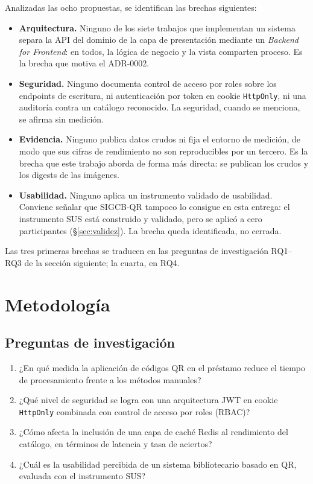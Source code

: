 \documentclass[11pt,a4paper]{article}
\begin{document}
Analizadas las ocho propuestas, se identifican las brechas siguientes:
\begin{itemize}[leftmargin=*]
  \item \textbf{Arquitectura.} Ninguno de los siete trabajos que implementan un
        sistema separa la API del dominio de la capa de presentación mediante un
        \emph{Backend for Frontend}: en todos, la lógica de negocio y la vista
        comparten proceso. Es la brecha que motiva el ADR-0002.
  \item \textbf{Seguridad.} Ninguno documenta control de acceso por roles sobre
        los endpoints de escritura, ni autenticación por token en cookie
        \texttt{HttpOnly}, ni una auditoría contra un catálogo reconocido. La
        seguridad, cuando se menciona, se afirma sin medición.
  \item \textbf{Evidencia.} Ninguno publica datos crudos ni fija el entorno de
        medición, de modo que sus cifras de rendimiento no son reproducibles por
        un tercero. Es la brecha que este trabajo aborda de forma más directa:
        se publican los crudos y los digests de las imágenes.
  \item \textbf{Usabilidad.} Ninguno aplica un instrumento validado de
        usabilidad. Conviene señalar que SIGCB-QR tampoco lo consigue en esta
        entrega: el instrumento SUS está construido y validado, pero se aplicó a
        cero participantes (§\ref{sec:validez}). La brecha queda identificada,
        no cerrada.
\end{itemize}

Las tres primeras brechas se traducen en las preguntas de investigación
RQ1--RQ3 de la sección siguiente; la cuarta, en RQ4.

\section{Metodología}\label{sec:metodo}

\subsection{Preguntas de investigación}

\begin{enumerate}[label=\textbf{RQ\arabic*.},leftmargin=*]
  \item ¿En qué medida la aplicación de códigos QR en el préstamo reduce el
        tiempo de procesamiento frente a los métodos manuales?
  \item ¿Qué nivel de seguridad se logra con una arquitectura JWT en cookie
        \texttt{HttpOnly} combinada con control de acceso por roles (RBAC)?
  \item ¿Cómo afecta la inclusión de una capa de caché Redis al rendimiento del
        catálogo, en términos de latencia y tasa de aciertos?
  \item ¿Cuál es la usabilidad percibida de un sistema bibliotecario basado en QR,
        evaluada con el instrumento SUS?
\end{enumerate}
\end{document}
